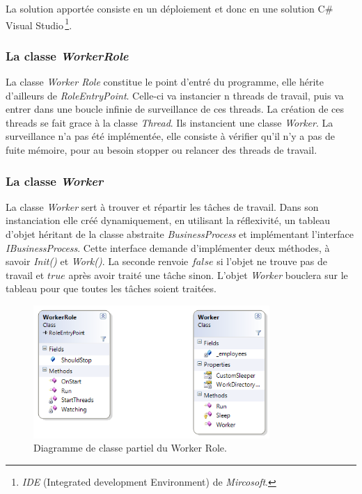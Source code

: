 La solution apportée consiste en un déploiement et donc en une
solution C\# Visual Studio\,\footnote{\textit{IDE} (Integrated development
  Environment) de \textit{Mircosoft}.}.




\subsubsection{La classe \textit{WorkerRole}}
La classe \textit{Worker Role} constitue le point d'entré du
programme, elle hérite d'ailleurs de \textit{RoleEntryPoint}. Celle-ci
va instancier n threads de travail, puis va entrer dans une boucle
infinie de surveillance de ces threads. La création de ces threads se
fait grace à la classe \textit{Thread}. Ils instancient une classe
\textit{Worker}. La surveillance n'a pas été implémentée, elle
consiste à vérifier qu'il n'y a pas de fuite mémoire, pour au besoin
stopper ou relancer des threads de travail.


\subsubsection{La classe \textit{Worker}}
La classe \textit{Worker} sert à trouver et répartir les tâches de
travail. Dans son instanciation elle créé dynamiquement, en utilisant
la réflexivité, un tableau d'objet héritant de la classe
abstraite \textit{BusinessProcess} et implémentant l'interface
\textit{IBusinessProcess}. Cette interface demande d'implémenter deux
méthodes, à savoir \textit{Init()} et \textit{Work()}. La seconde
renvoie $false$ si l'objet ne trouve pas de travail et $true$ après
avoir traité une tâche sinon. L'objet \textit{Worker} bouclera sur le
tableau pour que toutes les tâches soient traitées.

\begin{figure}[h!]
  \caption{Diagramme de classe partiel du Worker Role.}
  \centering
    \includegraphics[width=0.8\textwidth]{images/WorkerRole.png}
\end{figure}

